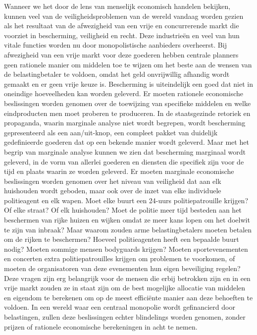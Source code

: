 \documentclass[
  a5paper,
  smalldemyvopaper,11pt,twoside,onecolumn,openright,extrafontsizes,
hidelinks]{memoir}
\begin{document}
Wanneer we het door de lens van menselijk economisch handelen bekijken,
kunnen veel van de veiligheidsproblemen van de wereld vandaag worden
gezien als het resultaat van de afwezigheid van een vrije en
concurrerende markt die voorziet in bescherming, veiligheid en recht.
Deze industrieën en veel van hun vitale functies worden nu door
monopolistische aanbieders overheerst. Bij afwezigheid van een vrije
markt voor deze goederen hebben centrale planners geen rationele manier
om middelen toe te wijzen om het beste aan de wensen van de
belastingbetaler te voldoen, omdat het geld onvrijwillig afhandig wordt
gemaakt en er geen vrije keuze is. Bescherming is uiteindelijk een goed
dat niet in oneindige hoeveelheden kan worden geleverd. Er moeten
rationele economische beslissingen worden genomen over de toewijzing van
specifieke middelen en welke eindproducten men moet proberen te
produceren. In de staatsgezinde retoriek en propaganda, waarin marginale
analyse niet wordt begrepen, wordt bescherming gepresenteerd als een
aan/uit-knop, een compleet pakket van duidelijk gedefinieerde goederen
dat op een bekende manier wordt geleverd. Maar met het begrip van
marginale analyse kunnen we zien dat bescherming marginaal wordt
geleverd, in de vorm van allerlei goederen en diensten die specifiek
zijn voor de tijd en plaats waarin ze worden geleverd. Er moeten
marginale economische beslissingen worden genomen over het niveau van
veiligheid dat aan elk huishouden wordt geboden, maar ook over de inzet
van elke individuele politieagent en elk wapen. Moet elke buurt een
24-uurs politiepatrouille krijgen? Of elke straat? Of elk huishouden?
Moet de politie meer tijd besteden aan het beschermen van rijke huizen
en wijken omdat ze meer kans lopen om het doelwit te zijn van inbraak?
Maar waarom zouden arme belastingbetalers moeten betalen om de rijken te
beschermen? Hoeveel politieagenten heeft een bepaalde buurt nodig?
Moeten sommige mensen bodyguards krijgen? Moeten sportevenementen en
concerten extra politiepatrouilles krijgen om problemen te voorkomen, of
moeten de organisatoren van deze evenementen hun eigen beveiliging
regelen? Deze vragen zijn erg belangrijk voor de mensen die erbij
betrokken zijn en in een vrije markt zouden ze in staat zijn om de best
mogelijke allocatie van middelen en eigendom te berekenen om op de meest
efficiënte manier aan deze behoeften te voldoen. In een wereld waar een
centraal monopolie wordt gefinancierd door belastingen, zullen deze
beslissingen echter blindelings worden genomen, zonder prijzen of
rationele economische berekeningen in acht te nemen.
\end{document}
